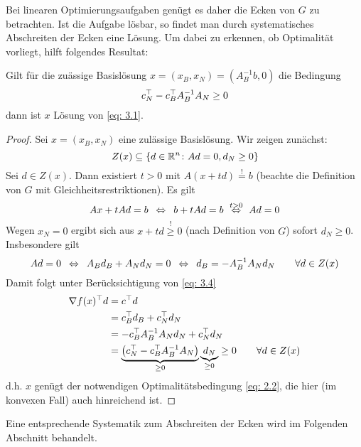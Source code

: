 Bei linearen Optimierungsaufgaben genügt es daher die Ecken von $G$ zu betrachten. Ist die Aufgabe lösbar, so findet man durch systematisches Abschreiten der Ecken eine Lösung.
Um dabei zu erkennen, ob Optimalität vorliegt, hilft folgendes Resultat:

\begin{aussage}[Optimalitätskriterium] %
	\label{aussage: 3.4}
	Gilt für die zuässige Basislösung $x = (x_B, x_N) = (A_B^{-1}b, 0)$ die Bedingung 
	\begin{equation}
		c_N^{\top} - c_B^{\top} A_B^{-1} A_N \ge 0 \label{eq: 3.4}
	\end{equation}
	dann ist $x$ Lösung von \eqref{eq: 3.1}.
\end{aussage}
\begin{proof}
	Sei $x = (x_B, x_N)$ eine zulässige Basislösung. Wir zeigen zunächst:
	\begin{equation*}
		Z(x) \subseteq \left\{ d \in \mathbb{R}^n \colon Ad = 0, d_N \ge 0 \right\}
	\end{equation*}
	Sei $d \in Z(x)$. Dann existiert $t > 0$ mit $A(x+td) \overset{!}{=} b$ (beachte die Definition von $G$ mit Gleichheitsrestriktionen). Es gilt 
	\begin{equation*}
		Ax + t Ad = b  \enskip \Leftrightarrow \enskip b + t Ad = b \overset{t > 0}{\enskip \Leftrightarrow \enskip} Ad = 0
	\end{equation*}
	Wegen $x_N = 0$ ergibt sich aus $x + td \overset{!}{\ge} 0$ (nach Definition von $G$) sofort $d_N \ge 0$. Insbesondere gilt
	\begin{equation*}
		Ad = 0 \enskip \Leftrightarrow \enskip A_B d_B + A_N d_N = 0 \enskip \Leftrightarrow \enskip d_B = -A_B^{-1} A_N d_N \qquad \forall d \in Z(x)
	\end{equation*}
	Damit folgt unter Berücksichtigung von \eqref{eq: 3.4}
	\begin{align*}
		\nabla f(x)^{\top} d 
		&= c^{\top} d \\
		&= c_B^{\top} d_B + c_N^{\top} d_N \\
		&= -c_B^{\top} A_B^{-1} A_N d_N + c_N^{\top} d_N \\
		&= \underbrace{\left( c_N^{\top} - c_B^{\top} A_B^{-1} A_N \right)}_{\ge 0} \underbrace{d_N}_{\ge 0} \ge 0 \qquad \forall d \in Z(x)
	\end{align*}
	d.h. $x$ genügt der notwendigen Optimalitätsbedingung \eqref{eq: 2.2}, die hier (im konvexen Fall) auch hinreichend ist.
\end{proof}

Eine entsprechende Systematik zum Abschreiten der Ecken wird im Folgenden Abschnitt behandelt.